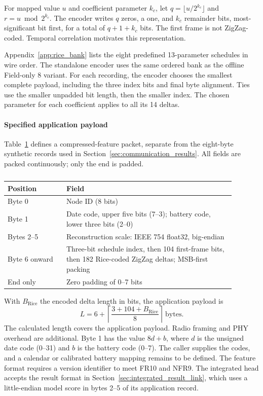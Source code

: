 For mapped value $u$ and coefficient parameter $k_c$, let $q=\lfloor u/2^{k_c}\rfloor$ and $r=u\bmod2^{k_c}$. The encoder writes $q$ zeros, a one, and $k_c$ remainder bits, most-significant bit first, for a total of $q+1+k_c$ bits. The first frame is not ZigZag-coded. Temporal correlation motivates this representation.

Appendix~\ref{app:rice_bank} lists the eight predefined 13-parameter schedules in wire order. The standalone encoder uses the same ordered bank as the offline Field-only 8 variant. For each recording, the encoder chooses the smallest complete payload, including the three index bits and final byte alignment. Ties use the smaller unpadded bit length, then the smaller index. The chosen parameter for each coefficient applies to all its 14 deltas.

\paragraph{Specified application payload}
Table~\ref{tab:codec_payload} defines a compressed-feature packet, separate from the eight-byte synthetic records used in Section~\ref{sec:communication_results}. All fields are packed continuously; only the end is padded.
\begin{table}[htbp]
\centering
\color{black}
\small
\caption{}
\label{tab:codec_payload}
\begin{tabular}{p{0.23\linewidth}p{0.66\linewidth}}
\toprule
Position & Field \\
\midrule
Byte 0 & Node ID (8 bits) \\
Byte 1 & Date code, upper five bits (7--3); battery code, lower three bits (2--0) \\
Bytes 2--5 & Reconstruction scale: IEEE 754 float32, big-endian \\
Byte 6 onward & Three-bit schedule index, then 104 first-frame bits, then 182 Rice-coded ZigZag deltas; MSB-first packing \\
End only & Zero padding of 0--7 bits \\
\bottomrule
\end{tabular}
\end{table}
With $B_{\mathrm{Rice}}$ the encoded delta length in bits, the application payload is
\[
L=6+\left\lceil\frac{3+104+B_{\mathrm{Rice}}}{8}\right\rceil\ \text{bytes}.
\]
The calculated length covers the application payload. Radio framing and PHY overhead are additional. Byte 1 has the value $8d+b$, where $d$ is the unsigned date code (0--31) and $b$ is the battery code (0--7). The caller supplies the codes, and a calendar or calibrated battery mapping remains to be defined. The feature format requires a version identifier to meet FR10 and NFR9. The integrated head accepts the result format in Section~\ref{sec:integrated_result_link}, which uses a little-endian model score in bytes 2--5 of its application record.

